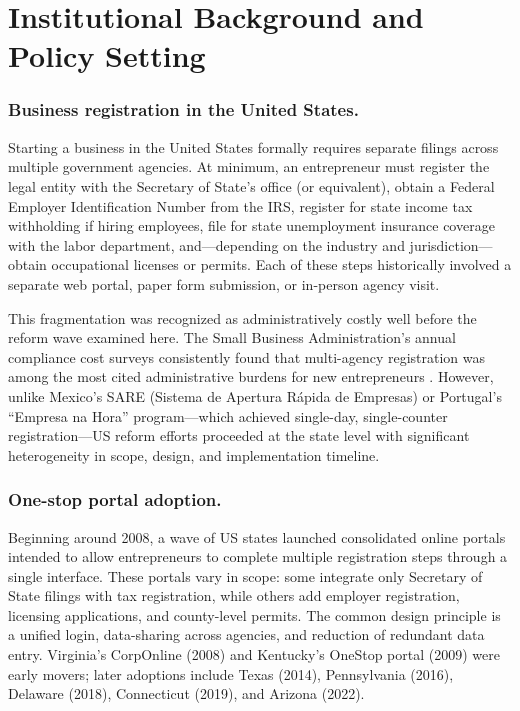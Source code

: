 \documentclass[12pt]{article}
\begin{document}
\section{Institutional Background and Policy Setting}

\subsubsection*{Business registration in the United States.}
Starting a business in the United States formally requires separate filings across multiple government agencies. At minimum, an entrepreneur must register the legal entity with the Secretary of State's office (or equivalent), obtain a Federal Employer Identification Number from the IRS, register for state income tax withholding if hiring employees, file for state unemployment insurance coverage with the labor department, and---depending on the industry and jurisdiction---obtain occupational licenses or permits. Each of these steps historically involved a separate web portal, paper form submission, or in-person agency visit.

This fragmentation was recognized as administratively costly well before the reform wave examined here. The Small Business Administration's annual compliance cost surveys consistently found that multi-agency registration was among the most cited administrative burdens for new entrepreneurs \citep{crain2010}. However, unlike Mexico's SARE (Sistema de Apertura R\'{a}pida de Empresas) or Portugal's ``Empresa na Hora'' program---which achieved single-day, single-counter registration---US reform efforts proceeded at the state level with significant heterogeneity in scope, design, and implementation timeline.

\subsubsection*{One-stop portal adoption.}
Beginning around 2008, a wave of US states launched consolidated online portals intended to allow entrepreneurs to complete multiple registration steps through a single interface. These portals vary in scope: some integrate only Secretary of State filings with tax registration, while others add employer registration, licensing applications, and county-level permits. The common design principle is a unified login, data-sharing across agencies, and reduction of redundant data entry. Virginia's CorpOnline (2008) and Kentucky's OneStop portal (2009) were early movers; later adoptions include Texas (2014), Pennsylvania (2016), Delaware (2018), Connecticut (2019), and Arizona (2022).
\end{document}
